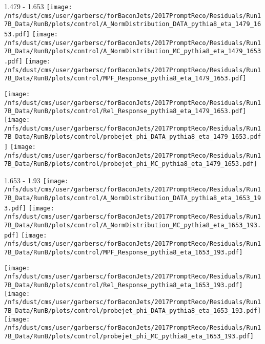 \documentclass[t,compress]{beamer}
\begin{document}
\begin{frame}{1.479 - 1.653}
	\texttt{[image: /nfs/dust/cms/user/garbersc/forBaconJets/2017PromptReco/Residuals/Run17B\_Data/RunB/plots/control/A\_NormDistribution\_DATA\_pythia8\_eta\_1479\_1653.pdf]}
	\texttt{[image: /nfs/dust/cms/user/garbersc/forBaconJets/2017PromptReco/Residuals/Run17B\_Data/RunB/plots/control/A\_NormDistribution\_MC\_pythia8\_eta\_1479\_1653.pdf]}
	\texttt{[image: /nfs/dust/cms/user/garbersc/forBaconJets/2017PromptReco/Residuals/Run17B\_Data/RunB/plots/control/MPF\_Response\_pythia8\_eta\_1479\_1653.pdf]}
\newline

	\texttt{[image: /nfs/dust/cms/user/garbersc/forBaconJets/2017PromptReco/Residuals/Run17B\_Data/RunB/plots/control/Rel\_Response\_pythia8\_eta\_1479\_1653.pdf]}
	\texttt{[image: /nfs/dust/cms/user/garbersc/forBaconJets/2017PromptReco/Residuals/Run17B\_Data/RunB/plots/control/probejet\_phi\_DATA\_pythia8\_eta\_1479\_1653.pdf]}
	\texttt{[image: /nfs/dust/cms/user/garbersc/forBaconJets/2017PromptReco/Residuals/Run17B\_Data/RunB/plots/control/probejet\_phi\_MC\_pythia8\_eta\_1479\_1653.pdf]}
\end{frame}

\begin{frame}{1.653 - 1.93}
	\texttt{[image: /nfs/dust/cms/user/garbersc/forBaconJets/2017PromptReco/Residuals/Run17B\_Data/RunB/plots/control/A\_NormDistribution\_DATA\_pythia8\_eta\_1653\_193.pdf]}
	\texttt{[image: /nfs/dust/cms/user/garbersc/forBaconJets/2017PromptReco/Residuals/Run17B\_Data/RunB/plots/control/A\_NormDistribution\_MC\_pythia8\_eta\_1653\_193.pdf]}
	\texttt{[image: /nfs/dust/cms/user/garbersc/forBaconJets/2017PromptReco/Residuals/Run17B\_Data/RunB/plots/control/MPF\_Response\_pythia8\_eta\_1653\_193.pdf]}
\newline

	\texttt{[image: /nfs/dust/cms/user/garbersc/forBaconJets/2017PromptReco/Residuals/Run17B\_Data/RunB/plots/control/Rel\_Response\_pythia8\_eta\_1653\_193.pdf]}
	\texttt{[image: /nfs/dust/cms/user/garbersc/forBaconJets/2017PromptReco/Residuals/Run17B\_Data/RunB/plots/control/probejet\_phi\_DATA\_pythia8\_eta\_1653\_193.pdf]}
	\texttt{[image: /nfs/dust/cms/user/garbersc/forBaconJets/2017PromptReco/Residuals/Run17B\_Data/RunB/plots/control/probejet\_phi\_MC\_pythia8\_eta\_1653\_193.pdf]}
\end{frame}
\end{document}
